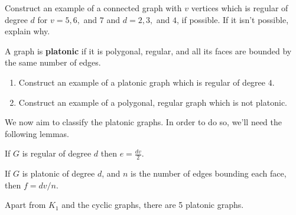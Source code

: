 \begin{examples} Construct an example of a connected graph with $v$ vertices which is regular of degree $d$ for $v = 5, 6,$ and $7$ and $d=2, 3,$ and $4$, if possible.  If it isn't possible, explain why.
\end{examples}

\begin{definition} A graph is \textbf{platonic} if it is polygonal, regular, and all its faces are bounded by the same number of edges.
\end{definition}

\begin{examples}\leavevmode
\begin{enumerate}
    \item Construct an example of a platonic graph which is regular of degree $4$.
    \item Construct an example of a polygonal, regular graph which is not platonic.
\end{enumerate}
\end{examples}

\noindent We now aim to classify the platonic graphs.  In order to do so, we'll need the following lemmas.

\begin{lemma} If $G$ is regular of degree $d$ then $e=\frac{dv}{2}$.
\end{lemma}

\begin{lemma} If $G$ is platonic of degree $d$, and $n$ is the number of edges bounding each face, then $f = dv/n$.
\end{lemma}

\begin{theorem}[Euclid] Apart from $K_1$ and the cyclic graphs, there are 5 platonic graphs.
\end{theorem}

